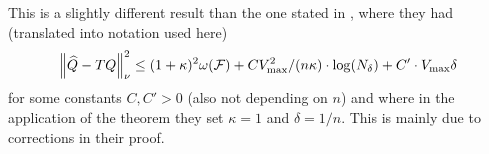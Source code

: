 \begin{rem}
This is a slightly different result than the one stated in ,
where they had (translated into notation used here)
\begin{equation}
  \norm{\widehat{Q} - TQ}_\nu^2
  \leq (1+\kappa)^2 \omega(\mathcal{F}) + C V_{\max}^2/(n \kappa)
  \cdot \log (N_\delta) + C'\cdot V_{\max} \delta
  \label{eq:onestepFan}
\end{equation}
for some constants $C, C'>0$ (also not depending on $n$) and where
in the application of the theorem they set
$\kappa = 1$ and $\delta = 1/n$.
This is mainly due to corrections in their proof.
\end{rem}

